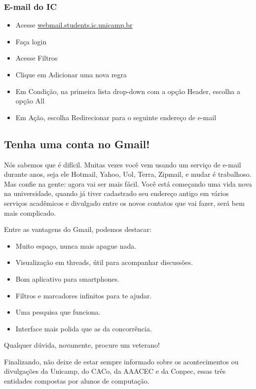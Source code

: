 \subsubsection*{E-mail do IC}

\begin{itemize}
    \item  Acesse \url{webmail.students.ic.unicamp.br}
    \item  Faça login
    \item  Acesse Filtros
    \item  Clique em Adicionar uma nova regra
    \item  Em Condição, na primeira lista drop-down com a opção Header, escolha a opção All
    \item  Em Ação, escolha Redirecionar para o seguinte endereço de e-mail
\end{itemize}

\subsection{Tenha uma conta no Gmail!}

Nós sabemos que é difícil. Muitas vezes você vem usando um serviço de e-mail
durante anos, seja ele Hotmail, Yahoo, Uol, Terra, Zipmail, e mudar é
trabalhoso.  Mas confie na gente: agora vai ser mais fácil. Você está começando
uma vida nova na universidade, quando já tiver cadastrado seu endereço antigo em
vários serviços acadêmicos e divulgado entre os novos contatos que vai fazer,
será bem mais complicado.

Entre as vantagens do Gmail, podemos destacar:

\begin{itemize}
    \item Muito espaço, nunca mais apague nada.
    \item Visualização em threads, útil para acompanhar discussões.
    \item Bom aplicativo para smartphones.
    \item Filtros e marcadores infinitos para te ajudar.
    \item Uma pesquisa que funciona.
    \item Interface mais polida que as da concorrência.
\end{itemize}

Qualquer dúvida, novamente, procure um veterano!

Finalizando, não deixe de estar sempre informado sobre os acontecimentos ou
divulgações da Unicamp, do CACo, da AAACEC e da Conpec, essas três entidades
compostas por alunos de computação.
